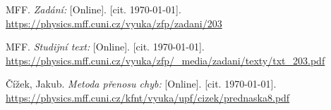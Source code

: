 
\begin{thebibliography}{9}

 MFF. \emph{Zadání:} [Online]. [cit. \today]. \newline \url{https://physics.mff.cuni.cz/vyuka/zfp/zadani/203}

 MFF. \emph{Studijní text:} [Online]. [cit. \today]. \newline \url{https://physics.mff.cuni.cz/vyuka/zfp/_media/zadani/texty/txt_203.pdf}

 Čížek, Jakub. \emph{Metoda přenosu chyb:} [Online]. [cit. \today]. \newline \url{https://physics.mff.cuni.cz/kfnt/vyuka/upf/cizek/prednaska8.pdf}

\end{thebibliography}
